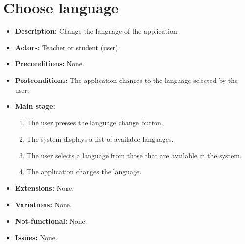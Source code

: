 \section{Choose language}
\begin{itemize}
	\item \textbf{Description:} Change the language of the application.
	\item \textbf{Actors:} Teacher or student (user).
	\item \textbf{Preconditions:} None. %
	\item \textbf{Postconditions:} The application changes to the language selected by the user.
	\item \textbf{Main stage:}
	\begin{enumerate}
		\item The user presses the language change button.
		\item The system displays a list of available languages.
		\item The user selects a language from those that are available in the system.
		\item The application changes the language.
	\end{enumerate}
	\item \textbf{Extensions:} None.
	\item \textbf{Variations:} None.
	\item \textbf{Not-functional:} None.
	\item \textbf{Issues:} None.
\end{itemize}

